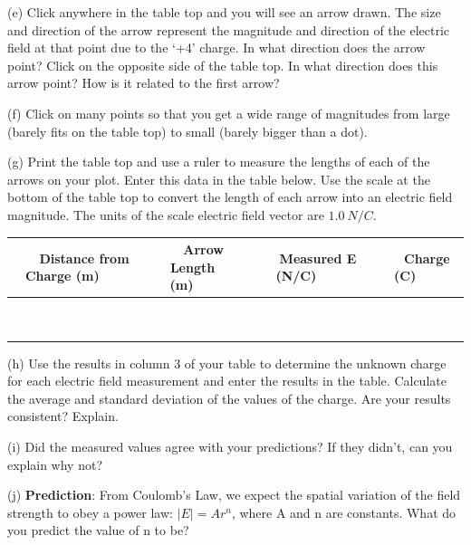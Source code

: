 (e) Click anywhere in the table top and you will see an arrow drawn.
The size and direction of the arrow represent the magnitude and direction of
the electric field at that point due to the `+4' charge.
In what direction does the arrow point?
Click on the opposite side of the table top.
In what direction does this arrow point? How is it related to the first arrow?
\vspace{15mm}

(f) Click on many points so that you get a wide range of magnitudes from large
(barely fits on the table top) to small (barely bigger than a dot).

(g) Print the table top and use a ruler to measure the lengths of each of the arrows
on your plot. Enter this data in the table below.
Use the scale at the bottom of the table top to convert the length of each arrow into 
an electric field magnitude.
The units of the scale electric field vector are $1.0 ~ N/C$.

\vspace{0.3cm}
{\centering \begin{tabular}{|c|c|c|c|}
\hline 
~~~Distance from Charge (m)~~~&
~~~Arrow Length (m)~~~&
~~~Measured E (N/C)~~~&
~~~Charge (C)~~~\\
\hline
\hline 
&
&
&
\\
\hline 
&
&
&
\\
\hline 
&
&
&
\\
\hline 
&
&
&
\\
\hline 
&
&
&
\\
\hline 
&
&
&
\\
\hline 
&
&
&
\\
\hline 
&
&
&
\\
\hline 
&
&
&
\\
\hline
\end{tabular}\par}
\vspace{0.3cm}

(h) Use the results in column 3 of your table to determine the unknown charge for each
electric field measurement and enter the results in the table.
Calculate the average and standard deviation of the values of the charge.
Are your results consistent? Explain.
\vspace{15mm}

(i) Did the measured values agree with your predictions? If they didn't,
can you explain why not?\vspace{15mm}

(j) \textbf{Prediction}: From Coulomb's Law, we expect the spatial variation
of the field strength to obey a power law: \( \left| E\right| =Ar^{n} \),
where A and n are constants. What do you predict the value of n to
be?\vspace{15mm}

